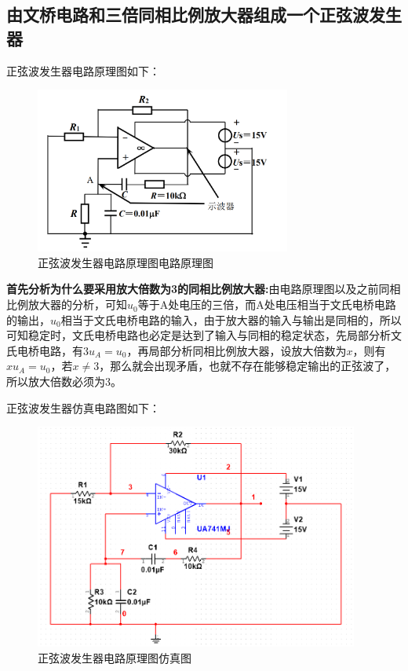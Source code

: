 \documentclass[UTF8]{ctexart}
\begin{document}
\subsection{由文桥电路和三倍同相比例放大器组成一个正弦波发生器}
正弦波发生器电路原理图如下：
\begin{figure}[H]
\centering
\includegraphics[width=0.75\textwidth]{G.png}
\caption{正弦波发生器电路原理图电路原理图}
\end{figure}

\textbf{首先分析为什么要采用放大倍数为3的同相比例放大器:}由电路原理图以及之前同相比例放大器的分析，可知$u_0$等于A处电压的三倍，而A处电压相当于文氏电桥电路的输出，$u_0$相当于文氏电桥电路的输入，由于放大器的输入与输出是同相的，所以可知稳定时，文氏电桥电路也必定是达到了输入与同相的稳定状态，先局部分析文氏电桥电路，有$3u_A=u_0$，再局部分析同相比例放大器，设放大倍数为$x$，则有$xu_A=u_0$，若$x\neq3$，那么就会出现矛盾，也就不存在能够稳定输出的正弦波了，所以放大倍数必须为3。

正弦波发生器仿真电路图如下：
\begin{figure}[H]
\centering
\includegraphics[width=0.95\textwidth]{H.png}
\caption{正弦波发生器电路原理图仿真图}
\end{figure}
\end{document}
